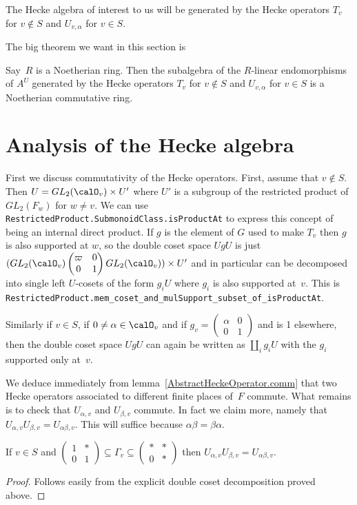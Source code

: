 The Hecke algebra of interest to us will be generated by the Hecke operators $T_v$ for $v\notin S$
and $U_{v,\alpha}$ for $v\in S$.

The big theorem we want in this section is
\begin{theorem}
  \label{nolean-hecke-algebra-commutative-noetherian}
  Say~$R$ is a Noetherian ring. Then the subalgebra of the $R$-linear endomorphisms
  of $A^U$ generated by the Hecke operators $T_v$ for $v\notin S$ and $U_{v,\alpha}$ for $v\in S$
  is a Noetherian commutative ring.
\end{theorem}

\section{Analysis of the Hecke algebra}

First we discuss commutativity of the Hecke operators. First, assume that $v\not\in S$.
Then $U=GL_2(\calO_v)\times U'$ where $U'$ is a subgroup of the restricted product
of $GL_2(F_w)$ for $w\not=v$. We can use {\tt RestrictedProduct.SubmonoidClass.isProductAt} to express this
concept of being an internal direct product. If $g$ is the element of $G$ used to make $T_v$ then
$g$ is also supported at $w$, so the double coset space $UgU$ is just
$(GL_2(\calO_v)\begin{pmatrix}\varpi&0\\0&1\end{pmatrix}GL_2(\calO_v))\times U'$
and in particular can be decomposed into single left $U$-cosets of the form $g_iU$
where $g_i$ is also supported at~$v$. This is {\tt RestrictedProduct.mem\_coset\_and\_mulSupport\_subset\_of\_isProductAt}.

Similarly if $v\in S$, if $0\not=\alpha\in\calO_v$ and if $g_v=\begin{pmatrix}\alpha&0\\0&1\end{pmatrix}$
and is 1 elsewhere, then the double coset space $UgU$ can again be written as $\coprod_i g_iU$
with the $g_i$ supported only at~$v$.

We deduce immediately from lemma~\ref{AbstractHeckeOperator.comm} that two Hecke operators
associated to different finite places of~$F$ commute.
What remains is to check that $U_{\alpha,v}$ and $U_{\beta,v}$ commute. In fact we claim
more, namely that $U_{\alpha,v}U_{\beta,v}=U_{\alpha\beta,v}$. This will suffice
because $\alpha\beta=\beta\alpha$.

\begin{lemma}
  \label{nolean-product-of-U-alpha}
  If $v\in S$ and $\begin{pmatrix}1&*\\0&1\end{pmatrix}\subseteq\Gamma_v\subseteq\begin{pmatrix}*&*\\0&*\end{pmatrix}$
  then $U_{\alpha,v}U_{\beta,v}=U_{\alpha\beta,v}$.
\end{lemma}
\begin{proof} Follows easily from the explicit double coset decomposition proved above.
\end{proof}

